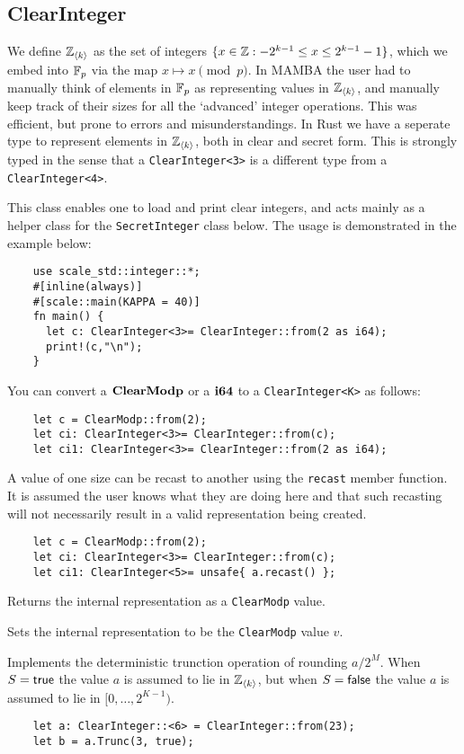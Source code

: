 \subsection{ClearInteger}
We define ${\mathbb{Z}}_{\langle k \rangle}$ as the set of integers $\{x \in {\mathbb{Z}}: -2^{k-1} \le x \le 2^{k-1}-1\}$,
which we embed into ${\mathbb{F}}_p$ via the map $x \mapsto x \pmod{p}$.
In MAMBA the user had to manually think of elements in ${\mathbb{F}}_p$
as representing values in ${\mathbb{Z}}_{\langle k \rangle}$, and manually keep track of their
sizes for all the `advanced' integer operations.
This was efficient, but prone to errors and misunderstandings.
In Rust we have a seperate type to represent elements in ${\mathbb{Z}}_{\langle k \rangle}$,
both in clear and secret form.
This is strongly typed in the sense that a
\verb|ClearInteger<3>|  is a different type from a
\verb|ClearInteger<4>|.

This class enables one to load and print clear integers, and acts
mainly as a helper class for the \verb|SecretInteger| class below.
The usage is demonstrated in the example below:
\begin{lstlisting}
    use scale_std::integer::*;
    #[inline(always)]
    #[scale::main(KAPPA = 40)]
    fn main() {
      let c: ClearInteger<3>= ClearInteger::from(2 as i64);
      print!(c,"\n");
    }
\end{lstlisting}

You can convert a $\mathbf{ClearModp}$ or a $\mathbf{i64}$ to a \verb|ClearInteger<K>| as follows:
\begin{lstlisting}
    let c = ClearModp::from(2);
    let ci: ClearInteger<3>= ClearInteger::from(c);
    let ci1: ClearInteger<3>= ClearInteger::from(2 as i64);
\end{lstlisting}

A value of one size can be recast to another using the \verb|recast|
member function. It is assumed the user knows what they are doing here
and that such recasting will not necessarily result in a valid representation
being created.
\begin{lstlisting}
    let c = ClearModp::from(2);
    let ci: ClearInteger<3>= ClearInteger::from(c);
    let ci1: ClearInteger<5>= unsafe{ a.recast() };
\end{lstlisting}

Returns the internal representation as a \verb|ClearModp| value.

Sets the internal representation to be the \verb|ClearModp| value $v$.

Implements the deterministic trunction operation of rounding $a/2^M$.
When $S={\mathsf{true}}$ the value $a$ is assumed to lie in ${\mathbb{Z}}_{\langle k \rangle}$,
but when $S={\mathsf{false}}$ the value $a$ is assumed to lie in $[0,\ldots,2^{K-1})$.
\begin{lstlisting}
    let a: ClearInteger::<6> = ClearInteger::from(23);
    let b = a.Trunc(3, true);
\end{lstlisting}

